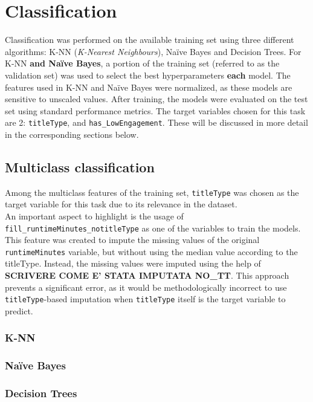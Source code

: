 \chapter{Classification}
\label{ch:capitolo3}
Classification was performed on the available training set using three different algorithms: K-NN (\textit{K-Nearest Neighbours}), Naïve Bayes and Decision Trees.
For K-NN \textbf{and Naïve Bayes}, a portion of the training set (referred to as the validation set) was used to select the best hyperparameters \textbf{each} model.
The features used in K-NN and Naïve Bayes were normalized, as these models are sensitive to unscaled values.
After training, the models were evaluated on the test set using standard performance metrics. 
The target variables chosen for this task are 2: \texttt{titleType}, and \texttt{has\_LowEngagement}.
These will be discussed in more detail in the corresponding sections below.

\section{Multiclass classification}\label{sec:multiclass_classification}
Among the multiclass features of the training set, \texttt{titleType} 
was chosen as the target variable for this task due to its relevance in the dataset.\\
An important aspect to highlight is the usage of \texttt{fill\_runtimeMinutes\_notitleType}
as one of the variables to train the models. 
This feature was created to impute the missing values of the original \texttt{runtimeMinutes} variable,
but without using the median value according to the titleType. Instead, the missing values were imputed using the help of
\textbf{SCRIVERE COME E' STATA IMPUTATA NO\_TT}.
This approach prevents a significant error, as it would be methodologically incorrect to use \texttt{titleType}-based 
imputation when \texttt{titleType} itself is the target variable to predict.
\subsection{K-NN}
\subsection{Naïve Bayes}
\subsection{Decision Trees}



